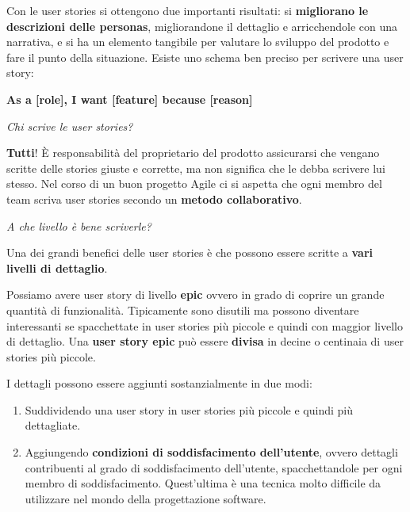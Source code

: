 \documentclass[a4paper,11pt,oneside]{book}
\begin{document}
Con le user stories si ottengono due importanti risultati: si \textbf{migliorano le descrizioni delle personas}, migliorandone il dettaglio e arricchendole con una narrativa, e si ha un elemento tangibile per valutare lo sviluppo del prodotto e fare il punto della situazione.
Esiste uno schema ben preciso per scrivere una user story:

\begin{center}
	\textbf{\large As a [role], I want [feature] because [reason]}
\end{center}

\begin{flushleft}
	\textit{Chi scrive le user stories?}
\end{flushleft}

\textbf{Tutti}! È responsabilità del proprietario del prodotto assicurarsi che vengano scritte delle stories giuste e corrette, ma non significa che le debba
scrivere lui stesso. Nel corso di un buon progetto Agile ci si aspetta che ogni membro del team scriva user stories secondo un \textbf{metodo collaborativo}.

\pagebreak

\begin{flushleft}
	\textit{A che livello è bene scriverle?}
\end{flushleft}

Una dei grandi benefici delle user stories è che possono essere
scritte a \textbf{vari livelli di dettaglio}.

Possiamo avere user story di livello \textbf{epic} ovvero in grado di
coprire un grande quantità di funzionalità. Tipicamente sono disutili ma possono diventare interessanti se spacchettate in user stories più piccole e quindi con maggior livello di dettaglio. Una \textbf{user story epic} può essere \textbf{divisa} in decine o centinaia di user stories più piccole.

I dettagli possono essere aggiunti sostanzialmente in due modi:
\begin{enumerate}
	\item Suddividendo una user story in user stories più piccole e quindi più dettagliate.
	\item Aggiungendo \textbf{condizioni di soddisfacimento dell'utente}, ovvero  dettagli contribuenti al grado di soddisfacimento dell'utente, spacchettandole per ogni membro di soddisfacimento. Quest'ultima è una tecnica molto difficile da utilizzare nel mondo della progettazione software.
\end{enumerate}
\end{document}
